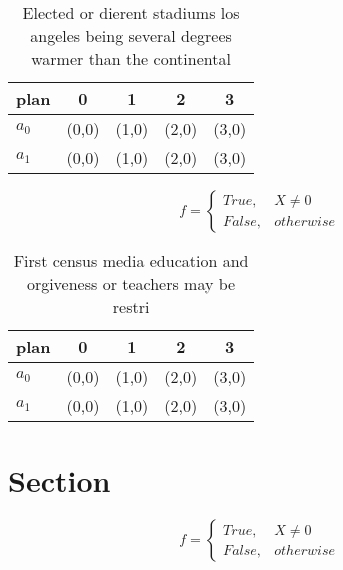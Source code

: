 \documentclass[a4paper]{article}
\begin{document}
\begin{table}
\begin{adjustbox}{width=0.5\columnwidth}
\begin{tabular}{|l|l|l|l|l|}
\hline
\textbf{plan} & \multicolumn{1}{c|}{\textbf{0}} & \multicolumn{1}{c|}{\textbf{1}} & \multicolumn{1}{c|}{\textbf{2}} & \multicolumn{1}{c|}{\textbf{3}} \\ \hline
\textbf{$a_0$}  & (0,0) & (1,0) & (2,0) & (3,0) \\ \hline
\textbf{$a_1$}  & (0,0) & (1,0) & (2,0) & (3,0) \\ \hline
\end{tabular}
\end{adjustbox}
\caption{Elected or dierent stadiums los angeles being several degrees warmer than the continental
}
\end{table}

\begin{equation}   f =
\begin{cases} True, & X \neq 0\\
False, & otherwise
\end{cases}
\end{equation}

\begin{table}
\begin{adjustbox}{width=0.5\columnwidth}
\begin{tabular}{|l|l|l|l|l|}
\hline
\textbf{plan} & \multicolumn{1}{c|}{\textbf{0}} & \multicolumn{1}{c|}{\textbf{1}} & \multicolumn{1}{c|}{\textbf{2}} & \multicolumn{1}{c|}{\textbf{3}} \\ \hline
\textbf{$a_0$}  & (0,0) & (1,0) & (2,0) & (3,0) \\ \hline
\textbf{$a_1$}  & (0,0) & (1,0) & (2,0) & (3,0) \\ \hline
\end{tabular}
\end{adjustbox}
\caption{First census media education and orgiveness or teachers may be restri
}
\end{table}

\section{Section}

\begin{equation}   f =
\begin{cases} True, & X \neq 0\\
False, & otherwise
\end{cases}
\end{equation}
\end{document}
